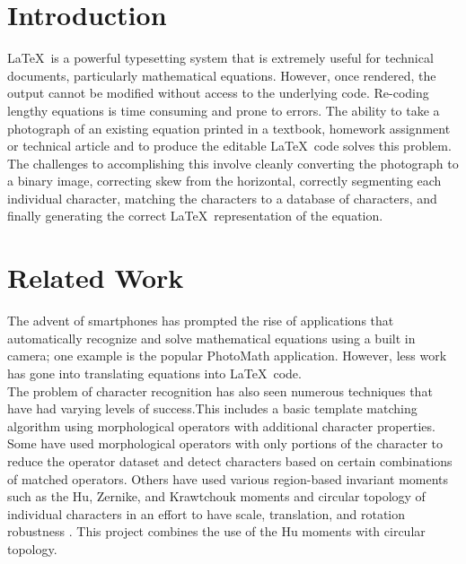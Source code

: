 \documentclass[journal]{IEEEtran}
\begin{document}
\section{Introduction}
% 
% 
% 
% 
\LaTeX\ is a powerful typesetting system that is extremely useful for technical documents, particularly mathematical equations. However, once rendered, the output cannot be modified without access to the underlying code. Re-coding lengthy equations is time consuming and prone to errors. The ability to take a photograph of an existing equation printed in a textbook, homework assignment or technical article and to produce the editable \LaTeX\ code solves this problem. The challenges to accomplishing this involve cleanly converting the photograph to a binary image, correcting skew from the horizontal, correctly segmenting each individual character, matching the characters to a database of characters, and finally generating the correct \LaTeX\ representation of the equation.

\section{Related Work}
The advent of smartphones has prompted the rise of applications that automatically recognize and solve mathematical equations using a built in camera; one example is the popular PhotoMath application\cite{PhotoMath:photomath}. However, less work has gone into translating equations into \LaTeX\ code.\\
The problem of character recognition has also seen numerous techniques that have had varying levels of success.This includes a basic template matching algorithm using morphological operators with additional character properties\cite{Naqvi:article_typical}. Some have used morphological operators with only portions of the character to reduce the operator dataset and detect characters based on certain combinations of matched operators\cite{Pradhan:article_typical}. Others have used various region-based invariant moments such as the Hu, Zernike, and Krawtchouk moments\cite{Potocnik:article_typical} and circular topology of individual characters in an effort to have scale, translation, and rotation robustness \cite{Torres-Mendez:article_typical}. This project combines the use of the Hu moments with circular topology.
\end{document}
